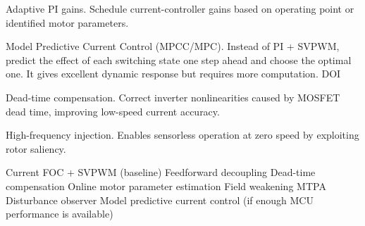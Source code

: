 {	Adaptive PI gains. Schedule current-controller gains based on operating point or identified motor parameters.

	Model Predictive Current Control (MPCC/MPC). Instead of PI + SVPWM, predict the effect of each switching state one step ahead and choose the optimal one. It gives excellent dynamic response but requires more computation. DOI

	Dead-time compensation. Correct inverter nonlinearities caused by MOSFET dead time, improving low-speed current accuracy.

	High-frequency injection. Enables sensorless operation at zero speed by exploiting rotor saliency.

	Current FOC + SVPWM (baseline)
	Feedforward decoupling
	Dead-time compensation
	Online motor parameter estimation
	Field weakening
	MTPA
	Disturbance observer
	Model predictive current control (if enough MCU performance is available)
}
